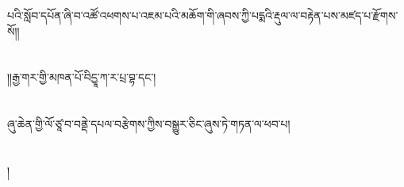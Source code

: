 པའི་སློབ་དཔོན་ཞི་བ་འཚོ་འཕགས་པ་འཇམ་པའི་མཆོག་གི་ཞབས་ཀྱི་པདྨའི་རྡུལ་ལ་བརྟེན་པས་མཛད་པ་རྫོགས་སོ།།\chapter{ }།།རྒྱ་གར་གྱི་མཁན་པོ་བིདྱཱ་ཀ་ར་པྲ་བྷ་དང་།\chapter{ }ཞུ་ཆེན་གྱི་ལོ་ཙཱ་བ་བནྡེ་དཔལ་བརྩེགས་ཀྱིས་བསྒྱུར་ཅིང་ཞུས་ཏེ་གཏན་ལ་ཕབ་པ།\chapter{ }།\chapter{ }